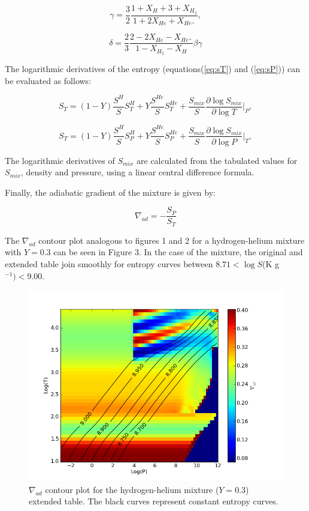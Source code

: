 \documentclass[apj]{emulateapj}
\begin{document}
\begin{equation}
\label{eq:gamma}
\gamma=\frac{3}{2}\frac{1+X_H+3+X_{H_2}}{1+2X_{He}+X_{He^+}},
\end{equation}

\begin{equation}
\label{eq:delta}
\delta=\frac{2}{3} \frac{2-2X_{He}-X_{He^+}}{1-X_{H_2}-X_H} \beta \gamma
\end{equation}

The logarithmic derivatives of the entropy (equations(\ref{eq:sT}) and (\ref{eq:sP})) can be evaluated as follows:

\begin{equation}
\label{eq:stmix}
S_T=(1-Y)\frac{S^H}{S}S_T^H+Y \frac{S^{He}}{S}S_T^{He}+\frac{S_{mix}}{S}\frac{\partial \log{S_{mix}}}{\partial \log{T}}\Big |_P,
\end{equation}

\begin{equation}
\label{eq:spmix}
S_T=(1-Y)\frac{S^H}{S}S_P^H+Y \frac{S^{He}}{S}S_P^{He}+\frac{S_{mix}}{S}\frac{\partial \log{S_{mix}}}{\partial \log{P}}\Big |_T,
\end{equation}

The logarithmic derivatives of $S_{mix}$ are calculated from the tabulated values for $S_{mix}$, density and pressure, using a linear central difference formula.

Finally, the adiabatic gradient of the mixture is given by:

\begin{equation}
\label{eq:deladmix}
\nabla_{ad}=-\frac{S_P}{S_T}
\end{equation}

The $\nabla_{ad}$ contour plot analogous to figures 1 and 2 for a hydrogen-helium mixture with $Y=0.3$ can be seen in Figure 3. In the case of the mixture, the original and extended table join smoothly for entropy curves between $8.71<\log{S}$(K g$^{-1})<9.00$.

\begin{figure}[h!]
\centering
\includegraphics[scale=.5]{../figs/EOS/delad_mixt_ext}
\caption{$\nabla_{ad}$ contour plot for the hydrogen-helium mixture ($Y=0.3$) extended table. The black curves represent constant entropy curves.}
\end{figure}
\end{document}
